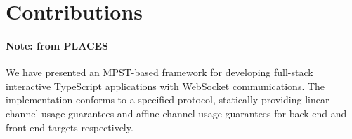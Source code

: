 \section{Contributions}

\paragraph{Note: from PLACES}

We have presented an MPST-based framework for developing full-stack interactive
TypeScript applications with WebSocket communications.
The implementation conforms to a specified
protocol, statically providing linear channel usage guarantees and affine
channel usage guarantees for back-end and front-end targets respectively.


